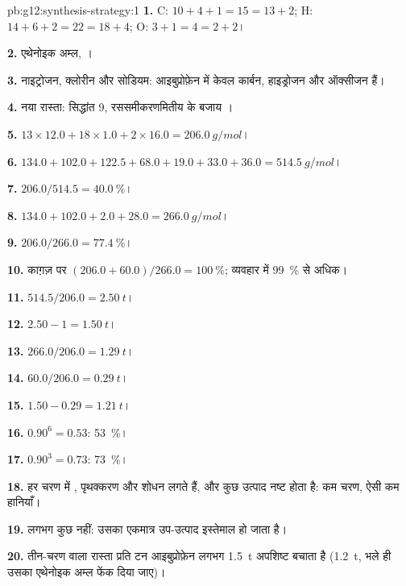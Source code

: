\begin{solution}{pb:g12:synthesis-strategy:1}
\textbf{1.} C: $10 + 4 + 1 = 15 = 13 + 2$; H: $14 + 6 + 2 = 22 = 18 + 4$;
O: $3 + 1 = 4 = 2 + 2$।

\textbf{2.} एथेनोइक अम्ल, ।

\textbf{3.} नाइट्रोजन, क्लोरीन और सोडियम: आइबुप्रोफ़ेन में केवल कार्बन,
हाइड्रोजन और ऑक्सीजन हैं।

\textbf{4.} नया रास्ता: सिद्धांत 9, रससमीकरणमितीय  के बजाय
।

\textbf{5.} $13 \times 12.0 + 18 \times 1.0 + 2 \times 16.0 =
\qty{206.0}{g/mol}$।

\textbf{6.} $134.0 + 102.0 + 122.5 + 68.0 + 19.0 + 33.0 + 36.0 =
\qty{514.5}{g/mol}$।

\textbf{7.} $206.0/514.5 = \qty{40.0}{\percent}$।

\textbf{8.} $134.0 + 102.0 + 2.0 + 28.0 = \qty{266.0}{g/mol}$।

\textbf{9.} $206.0/266.0 = \qty{77.4}{\percent}$।

\textbf{10.} काग़ज़ पर $(206.0 + 60.0)/266.0 = \qty{100}{\percent}$; व्यवहार में
\qty{99}{\percent} से अधिक।

\textbf{11.} $514.5/206.0 = \qty{2.50}{t}$।

\textbf{12.} $2.50 - 1 = \qty{1.50}{t}$।

\textbf{13.} $266.0/206.0 = \qty{1.29}{t}$।

\textbf{14.} $60.0/206.0 = \qty{0.29}{t}$।

\textbf{15.} $1.50 - 0.29 = \qty{1.21}{t}$।

\textbf{16.} $0.90^6 = 0.53$: \qty{53}{\percent}।

\textbf{17.} $0.90^3 = 0.73$: \qty{73}{\percent}।

\textbf{18.} हर चरण में , पृथक्करण और शोधन लगते हैं, और
कुछ उत्पाद नष्ट होता है: कम चरण, ऐसी कम हानियाँ।

\textbf{19.} लगभग कुछ नहीं: उसका एकमात्र उप-उत्पाद इस्तेमाल हो जाता है।

\textbf{20.} तीन-चरण वाला रास्ता प्रति टन आइबुप्रोफ़ेन लगभग \qty{1.5}{t} अपशिष्ट
बचाता है (\qty{1.2}{t}, भले ही उसका एथेनोइक अम्ल फेंक दिया
जाए)।
\end{solution}
